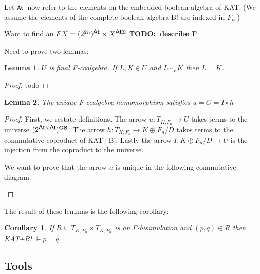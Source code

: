 \documentclass{article}
\newcommand{\atoms}{\textsf{\small{At}}}
\newcommand{\actions}{\Sigma}
\newcommand{\bisim}[1]{\sim_{#1}}
\newcommand{\gs}{\textbf{GS}}
\newcommand{\terms}{T_{K,F_n}}
\newcommand{\universe}{(2^{\atoms\times\atoms})^\gs}
\newcommand{\coproduct}{K \oplus F_n / D}
\newcommand{\todo}[1]{\textbf{TODO:~#1}}
\newtheorem{corollary}{Corollary}
\newtheorem{lemma}{Lemma}
\begin{document}
Let $\atoms$~now refer to the elements on the embedded boolean algebra of KAT.
(We assume the elements of the complete boolean algebra B! are indexed in $F_n$.)

Want to find an $F X = (2^{2n})^\atoms \times X^{\atoms\actions}$ \todo{describe F}

Need to prove two lemmas:

\begin{lemma}
  $U$ is final F-coalgebra.
  If $L,K \in U$ and $L \bisim{F} K$ then $L = K$.
\end{lemma}
\begin{proof}
  todo
\end{proof}

\begin{lemma}
  The unique F-coalgebra homomorphism satisfies $u = G = I \circ h$
\end{lemma}
\begin{proof}
  First, we restate definitions.
  The arrow $u : \terms \rightarrow U$ takes terms to the universe $\universe$.
  The arrow $h : \terms \rightarrow \coproduct$ takes terms to the commutative coproduct of KAT+B!.
  Lastly the arrow $I : \coproduct \rightarrow U$ is the injection from the coproduct to the universe.

  We want to prove that the arrow $u$ is unique in the following commutative diagram.
  \begin{center}
  \end{center}
  
\end{proof}

The result of these lemmas is the following corollary:
\begin{corollary}
  If $R \subseteq \terms \times \terms$ is an F-bisimulation and $(p,q) \in R$ then KAT+B! $\vDash p = q$
\end{corollary}

\subsection*{Tools}
\end{document}

